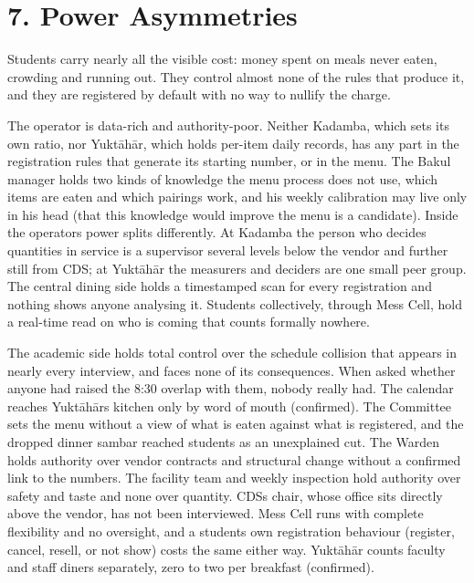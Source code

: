\documentclass[
  10pt,
  table]{article}
\newcounter{none} %
\begin{document}
\section{7. Power Asymmetries}\label{power-asymmetries}

Students carry nearly all the visible cost: money spent on meals never eaten, crowding and running out. They control almost none of the rules that produce it, and they are registered by default with no way to nullify the charge.

The operator is data-rich and authority-poor. Neither Kadamba, which sets its own ratio, nor Yuktāhār, which holds per-item daily records, has any part in the registration rules that generate its starting number, or in the menu. The Bakul manager holds two kinds of knowledge the menu process does not use, which items are eaten and which pairings work, and his weekly calibration may live only in his head (that this knowledge would improve the menu is a candidate). Inside the operators power splits differently. At Kadamba the person who decides quantities in service is a supervisor several levels below the vendor and further still from CDS; at Yuktāhār the measurers and deciders are one small peer group. The central dining side holds a timestamped scan for every registration and nothing shows anyone analysing it. Students collectively, through Mess Cell, hold a real-time read on who is coming that counts formally nowhere.

The academic side holds total control over the schedule collision that appears in nearly every interview, and faces none of its consequences. When asked whether anyone had raised the 8:30 overlap with them, nobody really had. The calendar reaches Yuktāhār\textquotesingle s kitchen only by word of mouth (confirmed). The Committee sets the menu without a view of what is eaten against what is registered, and the dropped dinner sambar reached students as an unexplained cut. The Warden holds authority over vendor contracts and structural change without a confirmed link to the numbers. The facility team and weekly inspection hold authority over safety and taste and none over quantity. CDS\textquotesingle s chair, whose office sits directly above the vendor, has not been interviewed. Mess Cell runs with complete flexibility and no oversight, and a student\textquotesingle s own registration behaviour (register, cancel, resell, or not show) costs the same either way. Yuktāhār counts faculty and staff diners separately, zero to two per breakfast (confirmed).
\end{document}
